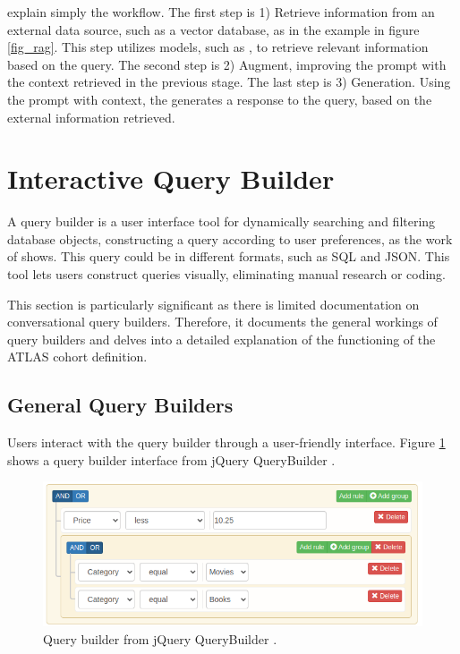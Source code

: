 \citet{gao_retrieval-augmented_2023} explain simply the workflow. The first step is 1) Retrieve information from an external data source, such as a vector database, as in the example in figure \ref{fig_rag}. This step utilizes {\ir} models, such as {\bm}, to retrieve relevant information based on the query. The second step is 2) Augment, improving the {\llm} prompt with the context retrieved in the previous stage. The last step is 3) Generation. Using the prompt with context, the {\llm} generates a response to the query, based on the external information retrieved.



\section{Interactive Query Builder}

A query builder is a user interface tool for dynamically searching and filtering database objects, constructing a query according to user preferences, as the work of \citet{mussa_forestqb_2022} shows. This query could be in different formats, such as SQL and JSON. This tool lets users construct queries visually, eliminating manual research or coding. 

This section is particularly significant as there is limited documentation on conversational query builders. Therefore, it documents the general workings of query builders and delves into a detailed explanation of the functioning of the ATLAS cohort definition.

\subsection{General Query Builders}


Users interact with the query builder through a user-friendly interface. Figure \ref{fig_query_builder} shows a query builder interface from jQuery QueryBuilder \cite{noauthor_jquery_nodate}.

\begin{figure}[ht]
    \includegraphics[width=14cm]{figs/chapter2/querybuilder.png}
    \centering
    \caption{Query builder from jQuery QueryBuilder \cite{noauthor_jquery_nodate}.}
    \label{fig_query_builder}
\end{figure}


